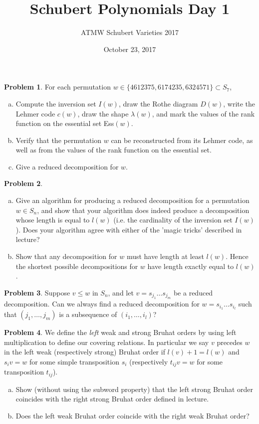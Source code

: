\documentclass{amsart}
\newcommand{\+}[1]{\ensuremath{\mathbf{#1}}}
\theoremstyle{definition}
\newtheorem{prob}{Problem}
\begin{document}
\title{Schubert Polynomials Day 1}
\date{October 23, 2017}
\author{ATMW Schubert Varieties 2017}

\maketitle

\begin{prob}
For each permutation $w \in \{ 4612375, 6174235, 6324571\} \subset S_7$,
\begin{enumerate}[(a)]
 \item Compute the inversion set $I(w)$, draw the Rothe diagram $D(w)$,
 write the Lehmer code $c(w)$, draw the shape $\lambda(w)$,
 and mark the values of the rank function on the essential set Ess$(w)$.
 \item Verify that the permutation $w$ can be reconstructed from its Lehmer code,
 as well as from the values of the rank function on the essential set.
 \item Give a reduced decomposition for $w$.
\end{enumerate}
\end{prob}


\begin{prob}
\begin{enumerate}[(a)]
\item Give an algorithm for producing a reduced decomposition for a permutation $w \in S_n$, and
show that your algorithm does indeed produce a decomposition whose length is
equal to $l(w)$ (i.e. the cardinality of the inversion set $I(w)$).
Does your algorithm agree with either of the 'magic tricks' described in lecture?
\item Show that any decomposition for $w$ must have length at least $l(w)$.
Hence the shortest possible decompositions for $w$ have
length exactly equal to $l(w)$.
\end{enumerate}
\end{prob}

\begin{prob}
 Suppose $v \leq w$ in $S_n$, and let $v = s_{j_1}\ldots s_{j_m}$ be a
 reduced decomposition.  Can we always
 find a reduced decomposition for $w = s_{i_1} \ldots s_{i_l}$
 such that $(j_1, \ldots, j_m)$ is a subsequence of $(i_1, \ldots, i_l)$?
\end{prob}

\begin{prob}
 We define the \emph{left} weak and strong Bruhat orders
 by using left multiplication to define our covering relations.
 In particular we say $v$ precedes $w$ in the left weak (respectively strong) Bruhat order 
 if $l(v)+1 = l(w)$ and $s_i v = w$ for some simple
 transposition $s_i$ (respectively $t_{ij}v = w$ for some transposition $t_{ij}$).
 \begin{enumerate}[(a)]
  \item Show (without using the subword property) that the left strong Bruhat order coincides with the right strong Bruhat order
  defined in lecture.
  \item Does the left weak Bruhat order coincide with the right weak Bruhat order?
 \end{enumerate}
\end{prob}
\end{document}
